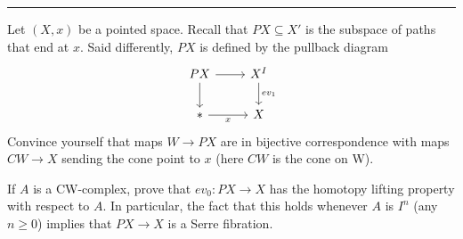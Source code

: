 \documentclass[letterpaper, 12pt]{article}
\begin{document}
\noindent\rule{7in}{2.8pt}

\begin{problem}{5}
Let \((X,x)\) be a pointed space. Recall that \(PX\subseteq X'\) is the subspace of paths that end at \(x\). Said differently, \(PX\) is defined by the pullback diagram 
\[\begin{tikzcd}
	PX & {X^I} \\
	{*} & X
	\arrow[from=1-1, to=1-2]
	\arrow[from=1-1, to=2-1]
	\arrow["{ev_1}", from=1-2, to=2-2]
	\arrow["x"', from=2-1, to=2-2]
\end{tikzcd}\]
Convince yourself that maps \(W\rightarrow PX\) are in bijective correspondence with maps \(CW\rightarrow X\) sending the cone point to \(x\) (here \(CW\) is the cone on W). 

If \(A\) is a CW-complex, prove that \(ev_0:PX\rightarrow X\) has the homotopy lifting property with respect to \(A\). In particular, the fact that this holds whenever \(A\) is \(I^n\) (any \(n\geq 0\)) implies that \(PX\rightarrow X\) is a Serre fibration.
\end{problem}
\end{document}
